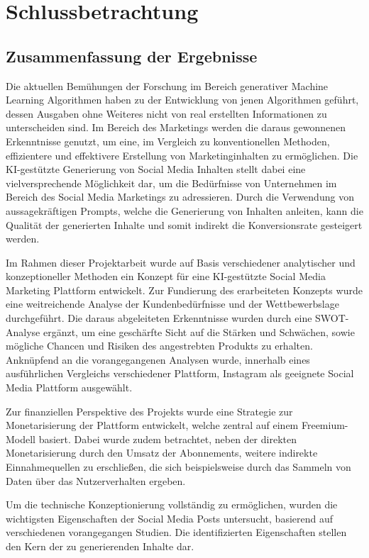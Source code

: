 \newpage
\section{Schlussbetrachtung}

\subsection{Zusammenfassung der Ergebnisse}

Die aktuellen Bemühungen der Forschung im Bereich generativer Machine Learning Algorithmen haben zu der Entwicklung von jenen Algorithmen geführt, dessen Ausgaben ohne Weiteres nicht von real erstellten Informationen zu unterscheiden sind.
Im Bereich des Marketings werden die daraus gewonnenen Erkenntnisse genutzt, um eine, im Vergleich zu konventionellen Methoden, effizientere und effektivere Erstellung von Marketinginhalten zu ermöglichen.
Die KI-gestützte Generierung von Social Media Inhalten stellt dabei eine vielversprechende Möglichkeit dar, um die Bedürfnisse von Unternehmen im Bereich des Social Media Marketings zu adressieren.
Durch die Verwendung von aussagekräftigen Prompts, welche die Generierung von Inhalten anleiten, kann die Qualität der generierten Inhalte und somit indirekt die Konversionsrate gesteigert werden.

Im Rahmen dieser Projektarbeit wurde auf Basis verschiedener analytischer und konzeptioneller Methoden ein Konzept für eine KI-gestützte Social Media Marketing Plattform entwickelt.
Zur Fundierung des erarbeiteten Konzepts wurde eine weitreichende Analyse der Kundenbedürfnisse und der Wettbewerbslage durchgeführt.
Die daraus abgeleiteten Erkenntnisse wurden durch eine SWOT-Analyse ergänzt, um eine geschärfte Sicht auf die Stärken und Schwächen, sowie mögliche Chancen und Risiken des angestrebten Produkts zu erhalten.
Anknüpfend an die vorangegangenen Analysen wurde, innerhalb eines ausführlichen Vergleichs verschiedener Plattform, Instagram als geeignete Social Media Plattform ausgewählt.

Zur finanziellen Perspektive des Projekts wurde eine Strategie zur Monetarisierung der Plattform entwickelt, welche zentral auf einem Freemium-Modell basiert.
Dabei wurde zudem betrachtet, neben der direkten Monetarisierung durch den Umsatz der Abonnements, weitere indirekte Einnahmequellen zu erschließen, die sich beispielsweise durch das Sammeln von Daten über das Nutzerverhalten ergeben.

Um die technische Konzeptionierung vollständig zu ermöglichen, wurden die wichtigsten Eigenschaften der Social Media Posts untersucht, basierend auf verschiedenen vorangegangen Studien.
Die identifizierten Eigenschaften stellen den Kern der zu generierenden Inhalte dar.

